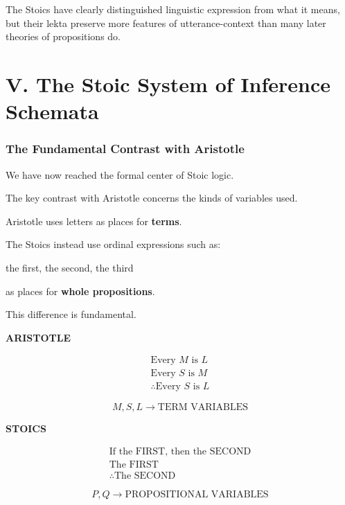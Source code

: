 \documentclass[11pt]{article}
\begin{document}
The Stoics have clearly distinguished linguistic expression from
what it means, but their lekta preserve more features of
utterance-context than many later theories of propositions do.


\part*{V. The Stoic System of Inference Schemata}

\section{The Fundamental Contrast with Aristotle}

We have now reached the formal center of Stoic logic.

The key contrast with Aristotle concerns the kinds of variables
used.

Aristotle uses letters as places for \textbf{terms}.

The Stoics instead use ordinal expressions such as:

\begin{center}
the first, the second, the third
\end{center}

as places for \textbf{whole propositions}.

This difference is fundamental.

\begin{whiteboard}
\textbf{ARISTOTLE}

\[
\begin{array}{l}
\text{Every }M\text{ is }L\\
\text{Every }S\text{ is }M\\
\hline
\therefore \text{Every }S\text{ is }L
\end{array}
\]

\[
M,S,L
\rightarrow
\boxed{\text{TERM VARIABLES}}
\]
\end{whiteboard}

\begin{whiteboard}
\textbf{STOICS}

\[
\begin{array}{l}
\text{If the FIRST, then the SECOND}\\
\text{The FIRST}\\
\hline
\therefore \text{The SECOND}
\end{array}
\]

\[
P,Q
\rightarrow
\boxed{\text{PROPOSITIONAL VARIABLES}}
\]
\end{whiteboard}
\end{document}
